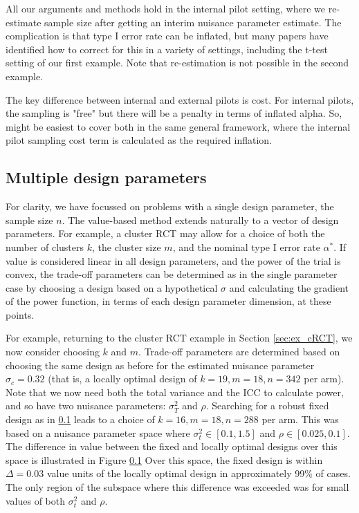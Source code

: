 \documentclass[sagev, Crown]{sagej}
\begin{document}
All our arguments and methods hold in the internal pilot setting, where we re-estimate sample size after getting an interim nuisance parameter estimate. The complication is that type I error rate can be inflated, but many papers have identified how to correct for this in a variety of settings, including the t-test setting of our first example. Note that re-estimation is not possible in the second example.

The key difference between internal and external pilots is cost. For internal pilots, the sampling is "free" but there will be a penalty in terms of inflated alpha. So, might be easiest to cover both in the same general framework, where the internal pilot sampling cost term is calculated as the required inflation.

\subsection{Multiple design parameters}

For clarity, we have focussed on problems with a single design parameter, the sample size $n$. The value-based method extends naturally to a vector of design parameters. For example, a cluster RCT may allow for a choice of both the number of clusters $k$, the cluster size $m$, and the nominal type I error rate $\alpha^*$. If value is considered linear in all design parameters, and the power of the trial is convex, the trade-off parameters can be determined as in the single parameter case by choosing a design based on a hypothetical $\sigma$ and calculating the gradient of the power function, in terms of each design parameter dimension, at these points.

For example, returning to the cluster RCT example in Section \ref{sec:ex_cRCT}, we now consider choosing $k$ and $m$. Trade-off parameters are determined based on choosing the same design as before for the estimated nuisance parameter $\sigma_c = 0.32$ (that is, a locally optimal design of $k =19, m=18, n=342$ per arm). Note that we now need both the total variance and the ICC to calculate power, and so have two nuisance parameters: $\sigma_T^2$ and $\rho$. Searching for a robust fixed design as in \ref{} leads to a choice of $k = 16, m = 18, n = 288$ per arm. This was based on a nuisance parameter space where $\sigma_t^2 \in [0.1, 1.5]$ and $\rho \in [0.025, 0.1]$. The difference in value between the fixed and locally optimal designs over this space is illustrated in Figure \ref{} Over this space, the fixed design is within $\Delta = 0.03$ value units of the locally optimal design in approximately 99\% of cases. The only region of the subspace where this difference was exceeded was for small values of both $\sigma_t^2$ and $\rho$.
\end{document}
